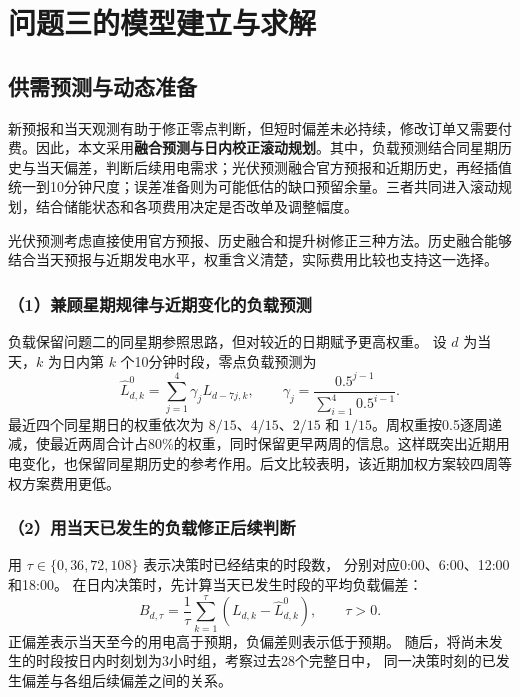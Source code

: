 \section{问题三的模型建立与求解}

\subsection{供需预测与动态准备}
新预报和当天观测有助于修正零点判断，但短时偏差未必持续，修改订单又需要付费。因此，本文采用\textbf{融合预测与日内校正滚动规划}。其中，负载预测结合同星期历史与当天偏差，判断后续用电需求；光伏预测融合官方预报和近期历史，再经插值统一到10分钟尺度；误差准备则为可能低估的缺口预留余量。三者共同进入滚动规划，结合储能状态和各项费用决定是否改单及调整幅度。

光伏预测考虑直接使用官方预报、历史融合和提升树修正三种方法。历史融合能够结合当天预报与近期发电水平，权重含义清楚，实际费用比较也支持这一选择。

\subsubsection*{（1）兼顾星期规律与近期变化的负载预测}

负载保留问题二的同星期参照思路，但对较近的日期赋予更高权重。
设 $d$ 为当天，$k$ 为日内第 $k$ 个10分钟时段，零点负载预测为
\begin{equation}
\widehat L^{0}_{d,k}
=\sum_{j=1}^{4}\gamma_jL_{d-7j,k},\qquad
\gamma_j=\frac{0.5^{j-1}}{\sum_{i=1}^{4}0.5^{i-1}}.
\end{equation}
最近四个同星期日的权重依次为 $8/15$、$4/15$、$2/15$ 和 $1/15$。周权重按0.5逐周递减，使最近两周合计占80\%的权重，同时保留更早两周的信息。这样既突出近期用电变化，也保留同星期历史的参考作用。后文比较表明，该近期加权方案较四周等权方案费用更低。

\subsubsection*{（2）用当天已发生的负载修正后续判断}

用 $\tau\in\{0,36,72,108\}$ 表示决策时已经结束的时段数，
分别对应0:00、6:00、12:00和18:00。
在日内决策时，先计算当天已发生时段的平均负载偏差：
\begin{equation}
B_{d,\tau}=\frac{1}{\tau}\sum_{k=1}^{\tau}
\left(L_{d,k}-\widehat L^{0}_{d,k}\right),\qquad \tau>0.
\end{equation}
正偏差表示当天至今的用电高于预期，负偏差则表示低于预期。
随后，将尚未发生的时段按日内时刻划为3小时组，考察过去28个完整日中，
同一决策时刻的已发生偏差与各组后续偏差之间的关系。

